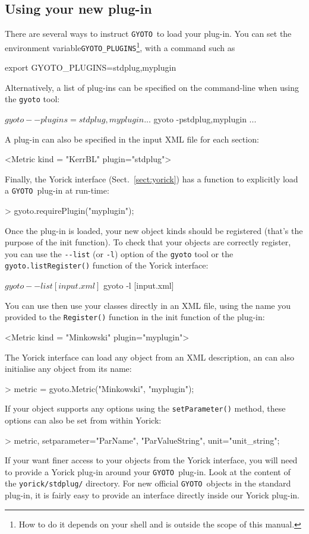 \documentclass[a4paper,12pt]{article}
\newcommand{\GYOTO}{\texttt{GYOTO}}
\begin{document}
\subsection{Using your new plug-in}
\label{sect:using-plug-in}
There are several ways to instruct \GYOTO\ to load your plug-in. You
can set the environment variable\texttt{GYOTO\_PLUGINS}\footnote{How
  to do it depends on your shell and is outside the scope of this
  manual.}, with a command such as
\begin{code}
  export GYOTO_PLUGINS=stdplug,myplugin
\end{code}
Alternatively, a list of plug-ins can be specified on the command-line
when using the \texttt{gyoto} tool:
\begin{code}
  $ gyoto --plugins=stdplug,myplugin ...
  $ gyoto -pstdplug,myplugin ...
\end{code}
A plug-in can also be specified in the input XML file for each
section:
\begin{code}
   <Metric kind = "KerrBL" plugin="stdplug">
\end{code}
Finally, the Yorick interface (Sect.~\ref{sect:yorick}) has a function
to explicitly load a \GYOTO\ plug-in at run-time:
\begin{code}
 > gyoto.requirePlugin("myplugin");
\end{code}
Once the plug-in is loaded, your new object kinds should be registered
(that's the purpose of the init function). To check that your objects
are correctly register, you can use the \texttt{-{}-list} (or
\texttt{-l}) option of the \texttt{gyoto} tool or the
\texttt{gyoto.listRegister()} function of the Yorick interface:
\begin{code}
  $ gyoto --list [input.xml]
  $ gyoto -l [input.xml]
\end{code}

You can use then use your classes directly in an XML file, using the
name you provided to the \texttt{Register()} function in the init
function of the plug-in:
\begin{code}
   <Metric kind = "Minkowski" plugin="myplugin">
\end{code}
The Yorick interface can load any object from an XML description, an
can also initialise any object from its name:
\begin{code}
 > metric = gyoto.Metric("Minkowski", "myplugin");
\end{code}
If your object supports any options using the \texttt{setParameter()}
method, these options can also be set from within Yorick:
\begin{code}
 > metric, setparameter="ParName", "ParValueString", unit="unit_string";
\end{code}
If your want finer access to your objects from the Yorick interface,
you will need to provide a Yorick plug-in around your \GYOTO\
plug-in. Look at the content of the \texttt{yorick/stdplug/}
directory. For new official \GYOTO\ objects in the standard plug-in,
it is fairly easy to provide an interface directly inside our Yorick
plug-in.
\end{document}
